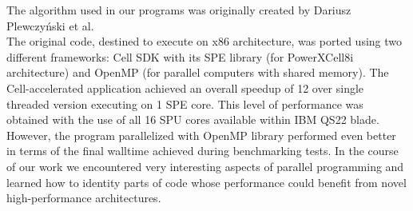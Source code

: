 The algorithm used in our programs  was originally created by Dariusz Plewczy\'nski
et al. \cite{3dhit1,3dhit2,3dhit3,3dhit4}\\
The original code, destined to execute on x86 architecture, was ported using two
different frameworks: Cell SDK with its SPE library (for PowerXCell8i
architecture) and OpenMP (for parallel computers with shared memory).
The Cell-accelerated application achieved an overall speedup of 12 over
single threaded version executing on 1 SPE core.
This level of performance was obtained with the use of all 16 SPU cores
available within IBM QS22 blade.
However, the program parallelized with OpenMP library performed even better in terms of the
final walltime achieved during benchmarking tests.
In the course of our work we encountered very interesting aspects of parallel
programming and learned how to identity parts of code whose performance
could benefit from novel high-performance architectures.

